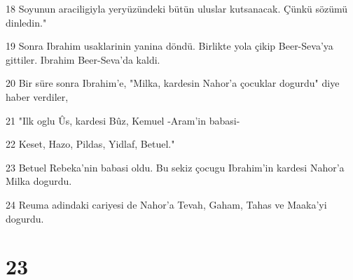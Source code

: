 \par 18 Soyunun araciligiyla yeryüzündeki bütün uluslar kutsanacak. Çünkü sözümü dinledin."
\par 19 Sonra Ibrahim usaklarinin yanina döndü. Birlikte yola çikip Beer-Seva'ya gittiler. Ibrahim Beer-Seva'da kaldi.
\par 20 Bir süre sonra Ibrahim'e, "Milka, kardesin Nahor'a çocuklar dogurdu" diye haber verdiler,
\par 21 "Ilk oglu Ûs, kardesi Bûz, Kemuel -Aram'in babasi-
\par 22 Keset, Hazo, Pildas, Yidlaf, Betuel."
\par 23 Betuel Rebeka'nin babasi oldu. Bu sekiz çocugu Ibrahim'in kardesi Nahor'a Milka dogurdu.
\par 24 Reuma adindaki cariyesi de Nahor'a Tevah, Gaham, Tahas ve Maaka'yi dogurdu.

\chapter{23}

